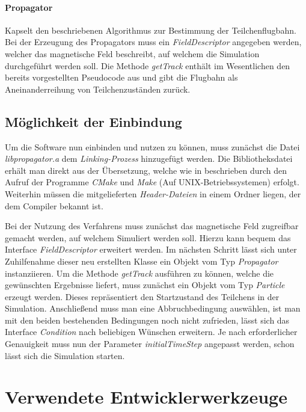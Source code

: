 \paragraph{Propagator}
Kapselt den beschriebenen Algorithmus zur Bestimmung der Teilchenflugbahn. Bei der Erzeugung des Propagators muss ein
\textit{FieldDescriptor} angegeben werden, welcher das magnetische Feld beschreibt, auf welchem die Simulation durchgef\"uhrt werden
soll. Die Methode \textit{getTrack} enth\"alt im Wesentlichen den bereits vorgestellten Pseudocode aus  und gibt
die Flugbahn als Aneinanderreihung von Teilchenzust\"anden zur\"uck.

\subsection{M\"oglichkeit der Einbindung}

Um die Software nun einbinden und nutzen zu k\"onnen, muss zun\"achst die Datei \textit{libpropagator.a} dem \textit{Linking-Prozess}
hinzugef\"ugt werden. Die Bibliotheksdatei erh\"alt man direkt aus der \"Ubersetzung, welche wie in  beschrieben
durch den Aufruf der Programme \textit{CMake} und \textit{Make} (Auf UNIX-Betriebssystemen) erfolgt. Weiterhin m\"ussen die
mitgelieferten \textit{Header-Dateien} in einem Ordner liegen, der dem Compiler bekannt ist.

Bei der Nutzung des Verfahrens muss zun\"achst das magnetische Feld zugreifbar gemacht werden, auf welchem Simuliert werden soll.
Hierzu kann bequem das Interface \textit{FieldDescriptor} erweitert werden. Im n\"achsten Schritt l\"asst sich unter Zuhilfenahme
dieser neu
erstellten Klasse ein Objekt vom Typ \textit{Propagator} instanziieren. Um die Methode \textit{getTrack} ausf\"uhren zu k\"onnen,
welche die gew\"unschten Ergebnisse liefert, muss zun\"achst ein Objekt vom Typ \textit{Particle} erzeugt werden. Dieses
repr\"asentiert den Startzustand des Teilchens in der Simulation. Anschlie{\ss}end muss man eine Abbruchbedingung ausw\"ahlen,
ist man mit den beiden bestehenden Bedingungen noch nicht zufrieden, l\"asst sich das Interface \textit{Condition} nach beliebigen
W\"unschen erweitern. Je nach erforderlicher Genauigkeit muss nun der Parameter \textit{initialTimeStep} angepasst werden, schon
l\"asst sich die Simulation starten.

\section{Verwendete Entwicklerwerkzeuge}


